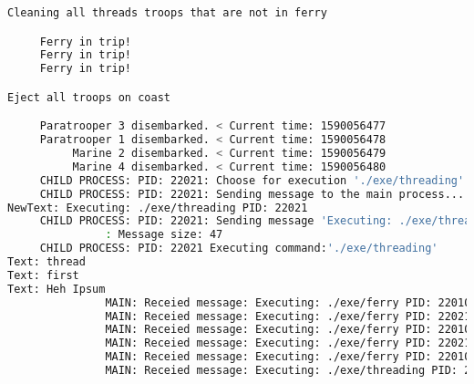 \documentclass{article}
\begin{document}
\begin{lstlisting}[language=BASH]
Cleaning all threads troops that are not in ferry

     Ferry in trip!
     Ferry in trip!
     Ferry in trip!

Eject all troops on coast

     Paratrooper 3 disembarked. < Current time: 1590056477
     Paratrooper 1 disembarked. < Current time: 1590056478
          Marine 2 disembarked. < Current time: 1590056479
          Marine 4 disembarked. < Current time: 1590056480
     CHILD PROCESS: PID: 22021: Choose for execution './exe/threading'
     CHILD PROCESS: PID: 22021: Sending message to the main process...
NewText: Executing: ./exe/threading PID: 22021
     CHILD PROCESS: PID: 22021: Sending message 'Executing: ./exe/threading PID: 22021' to the MAIN process...
               : Message size: 47
     CHILD PROCESS: PID: 22021 Executing command:'./exe/threading'
Text: thread
Text: first
Text: Heh Ipsum
               MAIN: Receied message: Executing: ./exe/ferry PID: 22010
               MAIN: Receied message: Executing: ./exe/ferry PID: 22021
               MAIN: Receied message: Executing: ./exe/ferry PID: 22010
               MAIN: Receied message: Executing: ./exe/ferry PID: 22021
               MAIN: Receied message: Executing: ./exe/ferry PID: 22010
               MAIN: Receied message: Executing: ./exe/threading PID: 22021
\end{lstlisting}
\end{document}
